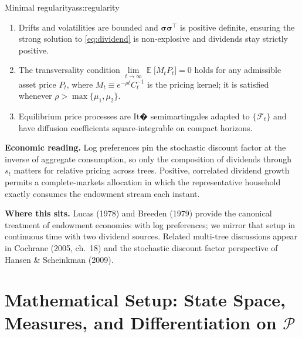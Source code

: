﻿\documentclass[11pt,letterpaper,oneside]{article}
\numberwithin{equation}{section}
\DeclareMathOperator{\E}{\mathbb{E}}
\newcommand{\1}{\mathbf{1}}
\begin{document}
\begin{assumption}{Minimal regularity}{ass:regularity}
\begin{enumerate}[label=(\alph*),itemsep=0.2em]
\item Drifts and volatilities are bounded and $\bm\sigma\bm\sigma^{\top}$ is positive definite, ensuring the strong solution to \cref{eq:dividend} is non-explosive and dividends stay strictly positive.
\item The transversality condition $\lim\limits_{t\to\infty} \E\big[M_t P_t\big]=0$ holds for any admissible asset price $P_t$, where $M_t\equiv e^{-\rho t}C_t^{-1}$ is the pricing kernel; it is satisfied whenever $\rho>\max\{\mu_1,\mu_2\}$.
\item Equilibrium price processes are It� semimartingales adapted to $\{\mathcal F_t\}$ and have diffusion coefficients square-integrable on compact horizons.
\end{enumerate}
\end{assumption}

\begin{tcolorbox}[didacticstyle]
\textbf{Economic reading.} Log preferences pin the stochastic discount factor at the inverse of aggregate consumption, so only the composition of dividends through $s_t$ matters for relative pricing across trees. Positive, correlated dividend growth permits a complete-markets allocation in which the representative household exactly consumes the endowment stream each instant.
\end{tcolorbox}

 
\begin{tcolorbox}[literaturestyle]
\textbf{Where this sits.} Lucas (1978) and Breeden (1979) provide the canonical treatment of endowment economies with log preferences; we mirror that setup in continuous time with two dividend sources. Related multi-tree discussions appear in Cochrane (2005, ch.~18) and the stochastic discount factor perspective of Hansen \& Scheinkman (2009).
\end{tcolorbox}
  

\section{Mathematical Setup: State Space, Measures, and Differentiation on \texorpdfstring{$\mathcal P$}{P}}
\end{document}
